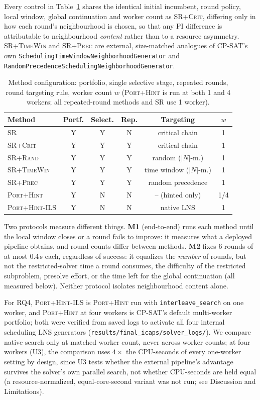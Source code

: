 \documentclass[letterpaper]{article} %
\newcommand{\base}{\textsc{SR}}
\newcommand{\crit}{\textsc{SR+Crit}}
\newcommand{\rnd}{\textsc{SR+Rand}}
\newcommand{\tw}{\textsc{SR+TimeWin}}
\newcommand{\precn}{\textsc{SR+Prec}}
\newcommand{\ph}{\textsc{Port+Hint}}
\newcommand{\native}{\textsc{Port+Hint-ILS}}
\begin{document}
Every control in Table~\ref{tab:methods} shares the identical initial incumbent, round policy, local window, global continuation and worker count as \crit{}, differing only in how each round's neighbourhood is chosen, so that any PI difference is attributable to neighbourhood \emph{content} rather than to a resource asymmetry. \tw{} and \precn{} are external, size-matched analogues of CP-SAT's own \texttt{Scheduling\-Time\-Window\-Neighborhood\-Generator} and \texttt{Random\-Precedence\-Scheduling\-Neighborhood\-Generator}.

\begin{table}[t]
\centering\footnotesize
\setlength{\tabcolsep}{2.3pt}
\begin{tabular}{lccccc}
\toprule
Method & Portf. & Select. & Rep. & Targeting & $w$ \\
\midrule
\base{} & Y & Y & N & critical chain & 1 \\
\crit{} & Y & Y & Y & critical chain & 1 \\
\rnd{} & Y & Y & Y & random ($|N|$-m.) & 1 \\
\tw{} & Y & Y & Y & time window ($|N|$-m.) & 1 \\
\precn{} & Y & Y & Y & random precedence & 1 \\
\ph{} & Y & N & N & -- (hinted only) & 1/4 \\
\native{} & Y & N & N & native LNS & 1 \\
\bottomrule
\end{tabular}
\caption{Method configuration: portfolio, single selective stage, repeated rounds, round targeting rule, worker count $w$ (\ph{} is run at both 1 and 4 workers; all repeated-round methods and \base{} use 1 worker).}
\label{tab:methods}
\end{table}

Two protocols measure different things. \textbf{M1} (end-to-end) runs each method until the local window closes or a round fails to improve: it measures what a deployed pipeline obtains, and round counts differ between methods. \textbf{M2} fixes 6 rounds of at most 0.4\,s each, regardless of success: it equalizes the \emph{number} of rounds, but not the restricted-solver time a round consumes, the difficulty of the restricted subproblem, presolve effort, or the time left for the global continuation (all measured below). Neither protocol isolates neighbourhood content alone.

For RQ4, \native{} is \ph{} run with \texttt{interleave\_search} on one worker, and \ph{} at four workers is CP-SAT's default multi-worker portfolio; both were verified from saved logs to activate all four internal scheduling LNS generators (\texttt{re\-sults/\-fi\-nal\_i\-caps/\-sol\-ver\_logs/}). We compare native search only at matched worker count, never across worker counts; at four workers (U3), the comparison uses $4\times$ the CPU-seconds of every one-worker setting by design, since U3 tests whether the external pipeline's advantage survives the solver's own parallel search, not whether CPU-seconds are held equal (a resource-normalized, equal-core-second variant was not run; see Discussion and Limitations).
\end{document}
